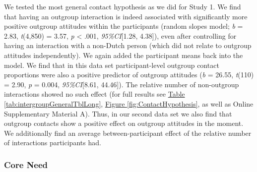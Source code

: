 \documentclass[man, 12pt, a4paper, mask]{apa7}
\theoremstyle{break}
\theoremstyle{plain}
\newcommand{\fgrref}[2][]{\hyperref[#2]{Figure \ref*{#2}#1}}
\newcommand{\tblref}[2][]{\hyperref[#2]{Table \ref*{#2}#1}}
\providecommand{\DIFaddtex}[1]{{\protect\color{blue}\uwave{#1}}} %
\providecommand{\DIFaddbegin}{} %
\providecommand{\DIFaddend}{} %
\providecommand{\DIFadd}[1]{\texorpdfstring{\DIFaddtex{#1}}{#1}} %
\newcommand{\DIFaddincludegraphics}[2][]{{\color{blue}\fbox{\DIFOincludegraphics[#1]{#2}}}} %
\DeclareRobustCommand{\DIFaddbegin}{\DIFOaddbegin \let\includegraphics\DIFaddincludegraphics} %
\DeclareRobustCommand{\DIFaddend}{\DIFOaddend \let\includegraphics\DIFOincludegraphics} %
\begin{document}
We tested the most general contact hypothesis as we did for Study 1. We
find that having an outgroup interaction is indeed associated with
significantly more positive outgroup attitudes within the participants
(random slopes model; \textit{b} = 2.83, \textit{t}(4,850) = 3.57,
\textit{p} \textless{} .001, \textit{95\%CI}{[}1.28, 4.38{]}), even
after controlling for having an interaction with a non-Dutch person
(which did not relate to outgroup attitudes independently). We again
added the participant means back into the model. We find that in this
data set participant-level outgroup contact proportions were also a
positive predictor of outgroup attitudes (\textit{b} = 26.55,
\textit{t}(110) = 2.90, \textit{p} = 0.004, \textit{95\%CI}{[}8.61,
44.46{]}). The relative number of non-outgroup interactions showed no
such effect (for full results see \tblref{tab:intergroupGeneralTblLong},
\fgrref{fig:ContactHypothesis}, as well as Online Supplementary Material
A). Thus, in our second data set we also find that outgroup contacts
show a positive effect on outgroup attitudes in the moment. We
additionally find an average between-participant effect of the relative
number of interactions participants had.

\subsubsection{Core Need \DIFaddbegin \DIFadd{Fulfillment}\DIFaddend }
\end{document}
